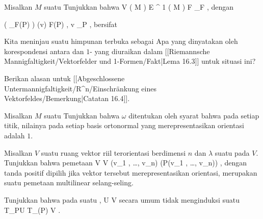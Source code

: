 {}
{

Misalkan $M$ suatu
Tunjukkan bahwa
\maabbeledisp {} {
{ \mathcal V } ( M )  } {
{ \mathcal E }^{  1 } (  M   )
} { F } { \omega_F
} {,}
dengan

\mavergleichskettedisp
{\vergleichskette
{ \left(  \omega_F(P)  \right) (v)
}
{ } { \left\langle F(P) , v  \right\rangle_P
}
{ } {
}
{ } {
}
{ } {
}
}
{}{}{,}
bersifat

}
{} {}

{}
{

Kita meninjau suatu himpunan terbuka
 sebagai
 Apa yang dinyatakan oleh korespondensi antara
dan
$1$-
yang diuraikan dalam
[[Riemannsche Mannigfaltigkeit/Vektorfelder und 1-Formen/Fakt|Lema 16.3]]
untuk situasi ini?

}
{} {}

{}
{

Berikan alasan untuk
[[Abgeschlossene Untermannigfaltigkeit/R^n/Einschränkung eines Vektorfeldes/Bemerkung|Catatan 16.4]].

}
{} {}

{}
{

Misalkan $M$ suatu
 Tunjukkan bahwa
 $\omega$ ditentukan oleh syarat bahwa pada setiap titik, nilainya pada setiap basis ortonormal yang merepresentasikan orientasi adalah $1$.

}
{} {}

{}
{

Misalkan $V$ suatu ruang vektor riil terorientasi berdimensi $n$ dan $\lambda$ suatu
pada $V$. Tunjukkan bahwa pemetaan
\maabbeledisp {} {V \times \cdots \times V} {\R
} {(v_1 , \ldots , v_n) } { \pm \lambda (P(v_1 , \ldots , v_n))
} {,}
dengan tanda positif dipilih jika vektor tersebut merepresentasikan orientasi, merupakan suatu pemetaan multilinear selang-seling.

}
{} {}

{}
{

Tunjukkan bahwa pada suatu
,
\maabbdisp {\alpha} { U } { V
} {}
secara umum tidak menginduksi suatu
 {T_PU} {T_{\alpha(P)} V
} {}
 {} {.}

}
{} {}

